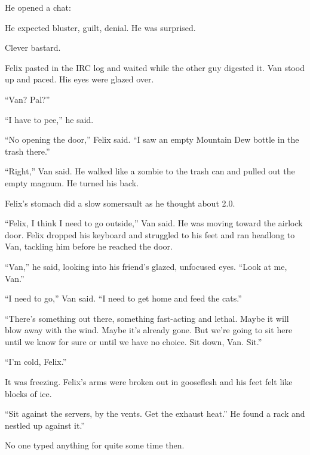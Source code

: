 He opened a chat:

He expected bluster, guilt, denial. He was surprised.

Clever bastard.

Felix pasted in the IRC log and waited while the other guy digested
it. Van stood up and paced. His eyes were glazed over.

“Van? Pal?”

“I have to pee,” he said.

“No opening the door,” Felix said. “I saw an empty Mountain Dew
bottle in the trash there.”

“Right,” Van said. He walked like a zombie to the trash can and
pulled out the empty magnum. He turned his back.

Felix’s stomach did a slow somersault as he thought about 2.0.

“Felix, I think I need to go outside,” Van said. He was moving
toward the airlock door. Felix dropped his keyboard and struggled
to his feet and ran headlong to Van, tackling him before he reached
the door.

“Van,” he said, looking into his friend’s glazed, unfocused eyes.
“Look at me, Van.”

“I need to go,” Van said. “I need to get home and feed the cats.”

“There’s something out there, something fast-acting and lethal.
Maybe it will blow away with the wind. Maybe it’s already gone. But
we’re going to sit here until we know for sure or until we have no
choice. Sit down, Van. Sit.”

“I’m cold, Felix.”

It was freezing. Felix’s arms were broken out in gooseflesh and his
feet felt like blocks of ice.

“Sit against the servers, by the vents. Get the exhaust heat.” He
found a rack and nestled up against it.”

No one typed anything for quite some time then.

